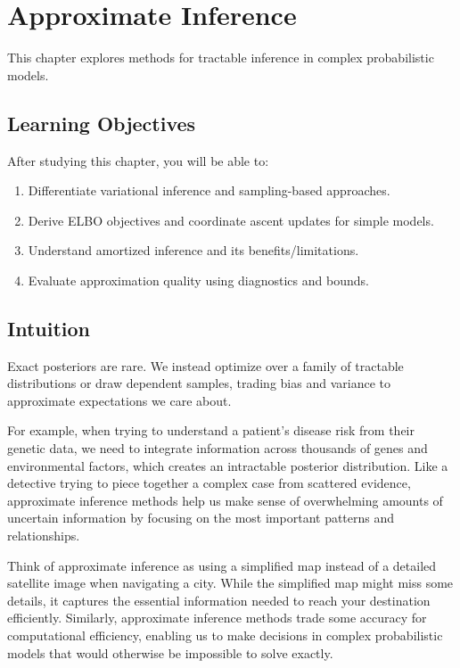 
\chapter{Approximate Inference}
\label{chap:approximate-inference}

This chapter explores methods for tractable inference in complex probabilistic models.


\section*{Learning Objectives}

After studying this chapter, you will be able to:

\begin{enumerate}
    \item Differentiate variational inference and sampling-based approaches.
    \item Derive ELBO objectives and coordinate ascent updates for simple models.
    \item Understand amortized inference and its benefits/limitations.
    \item Evaluate approximation quality using diagnostics and bounds.
\end{enumerate}



\section*{Intuition}

Exact posteriors are rare. We instead optimize over a family of tractable distributions or draw dependent samples, trading bias and variance to approximate expectations we care about.

For example, when trying to understand a patient's disease risk from their genetic data, we need to integrate information across thousands of genes and environmental factors, which creates an intractable posterior distribution. Like a detective trying to piece together a complex case from scattered evidence, approximate inference methods help us make sense of overwhelming amounts of uncertain information by focusing on the most important patterns and relationships.

Think of approximate inference as using a simplified map instead of a detailed satellite image when navigating a city. While the simplified map might miss some details, it captures the essential information needed to reach your destination efficiently. Similarly, approximate inference methods trade some accuracy for computational efficiency, enabling us to make decisions in complex probabilistic models that would otherwise be impossible to solve exactly.











